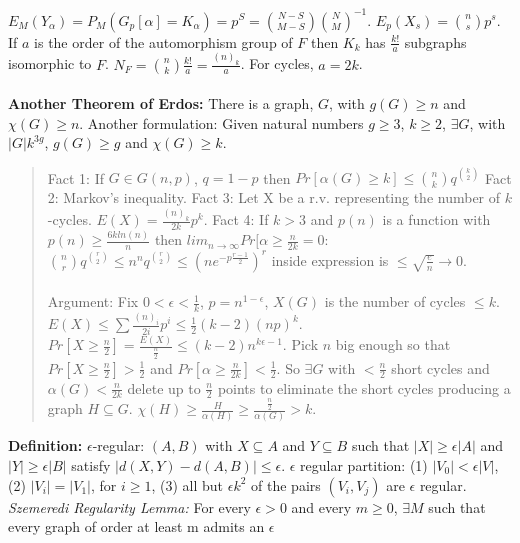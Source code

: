 $E_M (Y_{\alpha} )= P_M (G_p [ \alpha ]= K_{\alpha})= p^S =
{{N-S} \choose {M-S}} {N \choose M}^{-1}$.
$E_p ( X_s )= {n \choose s} p^s$.
If $a$ is the order of the automorphism group of $F$ then $K_k$ has
${\frac {k!} {a}}$ subgraphs isomorphic to $F$.
$N_F = {n \choose k} {\frac {k!} {a}}= {\frac {(n)_k} {a}}$.
For cycles, $a= 2k$.
\\
\\
{\bf Another Theorem of Erdos:}  There is a graph, $G$, with $g(G) \geq n$ and
$\chi (G) \geq n$.  Another formulation:  Given natural numbers 
$g \geq 3$,
$k \geq 2$, $\exists G$, with $|G| k^{3g}$, $g(G) \geq g$
and $\chi (G) \geq k$.
\begin{quote}
Fact 1: If $G \in G(n, p)$, $q= 1-p$ then
$Pr[ \alpha (G) \geq k ] \leq  {{n} \choose {k}} q^{{k} \choose {2}}$
Fact 2: Markov's inequality.
Fact 3: Let X be a r.v. representing the number of $k$-cycles.
$E(X) = {\frac {(n)_k} {2k}} p^k$.
Fact 4: If $k>3$ and $p(n)$ is a function with
$p(n) \geq {\frac {6 k ln(n) } {n} }$ then
$lim_{n \rightarrow \infty} Pr [ \alpha \geq {\frac {n} {2k}} = 0$:
${{n} \choose {r}} q^{{r} \choose {2}} \leq n^n q^{{r} \choose {2}} \leq
{(n e^{- p {\frac {r-1} {2}}})^r}$ inside expression is
$\leq {\sqrt {\frac {e} {n}}} \rightarrow 0$.
\\
\\
Argument:  Fix $ 0 < \epsilon < {\frac {1} {k}}$, $p= n^{1- \epsilon}$,
$X(G)$ is the number of cycles $\leq k$.  $E(X) \leq \sum
{\frac {(n)_i} {2i}} p^i \leq {\frac {1} {2}} (k-2) (np)^k$.
$Pr[X \geq {\frac {n} {2}}] = {\frac {E(X)} {\frac {n} {2}}} \leq
(k-2) n^{k \epsilon - 1}$.  Pick $n$ big enough so that
$Pr[X \geq {\frac {n} {2}}] > {\frac {1} {2}}$ and
$Pr[ \alpha \geq {\frac {n} {2k}}] < {\frac {1} {2}}$.  So $\exists G$ with
$<{\frac {n} {2}}$ short cycles and $\alpha(G) < {\frac {n} {2k}}$ delete up
to
${\frac {n} {2}}$ points to eliminate the short cycles producing a graph
$H \subseteq G$.  $\chi (H) \geq {\frac {H} {\alpha (H)}} \geq
{\frac {\frac {n} {2}} {\alpha (G)}} > k$.
\end{quote}
{\bf Definition:}
$\epsilon$-regular: $(A,B)$ with $X \subseteq A$ and $Y \subseteq B$ such that
$|X| \geq \epsilon |A|$ and
$|Y| \geq \epsilon |B|$ satisfy $|d(X,Y)-d(A,B)| \leq \epsilon$.
$\epsilon$ regular partition: (1) $| V_0 | < \epsilon |V|$, (2) $|V_i | = |
V_1 |$,
for $i \geq 1$, (3) all but $\epsilon k^2$ of the pairs $(V_i , V_j )$ are
$\epsilon$ regular.
\emph{Szemeredi Regularity Lemma:} For every $\epsilon >0$ and every $m \geq 0$,
$\exists M$ such that every graph of order at least m admits an $\epsilon$
